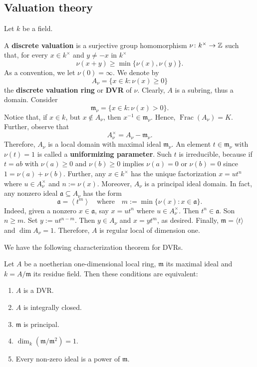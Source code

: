 \subsection{Valuation theory}
Let $k$ be a field. 
\begin{definition}\label{def:discrete-valuation}
	A \textbf{discrete valuation} is a surjective group homomorphism $\nu\colon k^{\times} \to {\mathbb Z}$ such that, for every $x\in k^{\times}$ and $y \neq -x$ in $k^{\times}$
	\[
		\nu(x + y) \geq \min\{\nu(x), \nu(y)\}.
	\]
	As a convention, we let $\nu(0) = \infty$. We denote by
	\[
	A_{\nu} = \{x \in k\colon \nu(x)\geq 0\}
	\]
	the \textbf{discrete valuation ring} or \textbf{DVR} of $\nu$. Clearly, $A$ is a subring, thus a domain. Consider
	\[
		\mathfrak{m}_{\nu} = \{x\in k\colon \nu(x) > 0\}. 
	\]
	Notice that, if $x\in k$, but $x\notin A_{\nu}$, then $x^{-1}\in \mathfrak{m}_{\nu}$. Hence, $\operatorname{Frac}(A_{\nu}) = K$. Further, observe that
	\[
	A_{\nu}^{\times} = A_{\nu} - \mathfrak{m}_{\nu}.
	\]
	Therefore, $A_{\nu}$ is a local domain with maximal ideal $\mathfrak{m}_{\nu}$. An element $t \in \mathfrak{m}_{\nu}$ with $\nu(t) = 1$ is called a \textbf{uniformizing parameter}. Such $t$ is irreducible, because if $t = ab$ with $\nu(a)\geq 0$ and $\nu(b)\geq 0$ implies $\nu(a) = 0$ or $\nu(b) = 0$ since $1 = \nu(a) + \nu(b)$. Further, any $x \in k^{\times}$ has the unique factorization $x = u t^{n}$ where $u \in A_{\nu}^{\times}$ and $n := \nu(x)$. Moreover, $A_{\nu}$ is a principal ideal domain. In fact, any nonzero ideal $\mathfrak{a} \subseteq A_{\nu}$ has the form
	\[
		\mathfrak{a} = \left\langle t^{m}\right\rangle \quad\text{where}\quad m:=\min\{\nu(x)\colon x\in \mathfrak{a}\}.
	\]
	Indeed, given a nonzero $x \in \mathfrak{a}$, say $x = ut^{n}$ where $u \in A_{\nu}^{\times}$. Then $t^{n}\in \mathfrak{a}$. Son $n \geq m$. Set $y := ut^{n-m}$. Then $y\in A_\nu$ and $x = yt^{m}$, as desired. Finally, $\mathfrak{m} = \langle t\rangle$ and $\dim A_{\nu} = 1$. Therefore, $A$ is regular local of dimension one.
\end{definition}
We have the following characterization theorem for DVRs.
\begin{theorem}\label{thm:characterization-of-DVRs}
	Let $A$ be a noetherian one-dimensional local ring, $\mathfrak{m}$ its maximal ideal and $k = A/\mathfrak{m}$ its residue field. Then these conditions are equivalent:
	\begin{enumerate}[label = (\roman*)]
		\item $A$ is a DVR.
		\item $A$ is integrally closed.
		\item $\mathfrak{m}$ is principal.
		\item $\dim_{k}(\mathfrak{m}/\mathfrak{m}^{2}) = 1$.
		\item Every non-zero ideal is a power of $\mathfrak{m}$.
	\end{enumerate}
\end{theorem}
